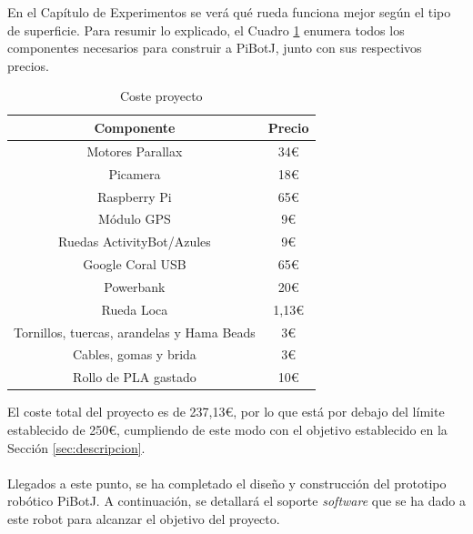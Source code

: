 En el Capítulo de Experimentos se verá qué rueda funciona mejor según el tipo de superficie. Para resumir lo explicado, el Cuadro \ref{cuadro:costetotal} enumera todos los componentes necesarios para construir a PiBotJ, junto con sus respectivos precios.

\begin{table}[H]
	\begin{center}
		\begin{tabular}{|c|c|}
			\hline
			Componente & Precio \\
			\hline
			Motores Parallax & 34€ \\
			\hline
			Picamera &  18€ \\
			\hline
			Raspberry Pi & 65€ \\
			\hline
			Módulo GPS & 9€ \\
			\hline
			Ruedas ActivityBot/Azules & 9€ \\
			\hline
			Google Coral USB & 65€ \\
			\hline
			Powerbank & 20€ \\
			\hline
			Rueda Loca & 1,13€ \\
			\hline
			Tornillos, tuercas, arandelas y Hama Beads & 3€ \\
			\hline
			Cables, gomas y brida & 3€ \\
			\hline
			Rollo de PLA gastado & 10€ \\
			\hline
		\end{tabular}
		\caption{Coste proyecto}
		\label{cuadro:costetotal}
	\end{center}
\end{table}

El coste total del proyecto es de 237,13€, por lo que está por debajo del límite establecido de 250€, cumpliendo de este modo con el objetivo establecido en la Sección \ref{sec:descripcion}.\\\\



Llegados a este punto, se ha completado el diseño y construcción del prototipo robótico PiBotJ. A continuación, se detallará el soporte \textit{software} que se ha dado a este robot para alcanzar el objetivo del proyecto.

